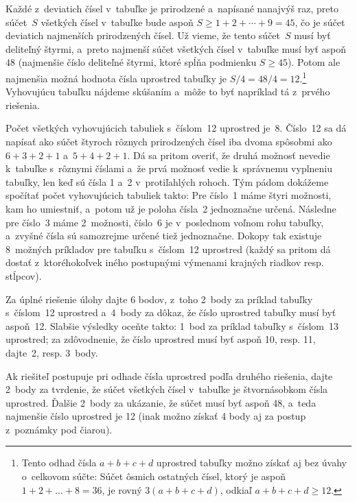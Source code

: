 {Každé z~deviatich čísel v~tabuľke je prirodzené
a~napísané nanajvýš raz, preto súčet~$S$ všetkých čísel v~tabuľke
bude aspoň $S\ge 1+2+\cdots+9 = 45$, čo je súčet deviatich najmenších
prirodzených čísel. Už vieme, že tento súčet~$S$ musí byť
deliteľný štyrmi, a~preto najmenší súčet všetkých čísel
v~tabuľke musí byť aspoň~$48$ (najmenšie číslo deliteľné
štyrmi, ktoré spĺňa podmienku $S\ge45$). Potom ale najmenšia možná
hodnota čísla uprostred tabuľky je $S/ 4 = 48/4 = 12$.\footnote{Tento odhad čísla
$a+b+c+d$ uprostred tabuľky možno získať aj bez úvahy o~celkovom súčte: Súčet ôsmich
ostatných čísel, ktorý je aspoň $1+2+\dots+8=36$, je rovný $3(a+b+c+d)$,
odkiaľ $a+b+c+d\ge12$.}
Vyhovujúcu tabuľku nájdeme skúšaním a~môže to byť napríklad tá z~prvého riešenia.

\poznamka
Počet všetkých vyhovujúcich tabuliek s~číslom~12 uprostred je~8. Číslo~12 sa dá
napísať ako súčet štyroch rôznych prirodzených čísel iba
dvoma spôsobmi ako
$6+3+2+1$ a~$5+4+2+1$. Dá sa pritom overiť, že druhá možnosť
nevedie k~tabuľke s~rôznymi číslami a~že prvá možnosť vedie
k~správnemu vyplneniu tabuľky, len keď sú čísla 1 a~2 v~protiľahlých
rohoch. Tým pádom dokážeme spočítať počet vyhovujúcich tabuliek
takto: Pre číslo~1 máme štyri možnosti, kam ho umiestniť, a~potom už je
poloha čísla~2 jednoznačne určená. Následne pre číslo~3 máme
2~možnosti, číslo~6 je v~poslednom voľnom rohu tabuľky, a~zvyšné
čísla sú samozrejme určené tiež jednoznačne. Dokopy tak existuje
8~možných príkladov pre tabuľku s~číslom~12 uprostred (každý sa
pritom dá dostať z~ktoréhokoľvek iného postupnými výmenami
krajných riadkov resp. stĺpcov).


\nobreak\medskip\petit\noindent
Za úplné riešenie úlohy dajte 6 bodov, z~toho 2~body za príklad tabuľky
s~číslom~12 uprostred a~4~body za dôkaz, že číslo uprostred tabuľky
musí byť aspoň~12. Slabšie výsledky oceňte takto: 1~bod za príklad tabuľky
s~číslom~13 uprostred; za zdôvodnenie, že číslo uprostred musí byť aspoň 10,
resp. 11, dajte~2, resp. 3~body.

Ak riešiteľ postupuje pri odhade čísla uprostred podľa druhého riešenia,
dajte 2~body za tvrdenie, že súčet všetkých čísel v~tabuľke je
štvornásobkom čísla uprostred. Ďalšie 2~body za ukázanie, že
súčet musí byť aspoň 48, a~teda najmenšie číslo uprostred je 12
(inak možno získať 4 body aj za postup z~poznámky pod čiarou).
\endpetit

}

